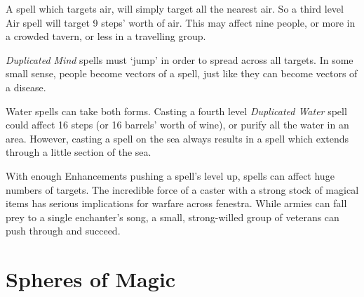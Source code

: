 \begin{multicols}{2}
\begin{exampletext}
  A spell which targets air, will simply target all the nearest air.
  So a third level Air spell will target 9 \glspl{step}' worth of air.
  This may affect nine people, or more in a crowded tavern, or less in a travelling group.

  \textit{Duplicated Mind} spells must `jump' in order to spread across all targets.
  In some small sense, people become vectors of a spell, just like they can become vectors of a disease.

  Water spells can take both forms.
  Casting a fourth level \textit{Duplicated Water} spell could affect 16 \glspl{step} (or 16 barrels' worth of wine), or purify all the water in an area.
  However, casting a spell on the sea always results in a spell which extends through a little section of the sea.
\end{exampletext}

With enough Enhancements pushing a spell's level up, spells can affect huge numbers of targets.
The incredible force of a caster with a strong stock of magical items has serious implications for warfare across \gls{fenestra}.
While armies can fall prey to a single enchanter's song, a small, strong-willed group of veterans can push through and succeed.

\end{multicols}

\section{Spheres of Magic}

